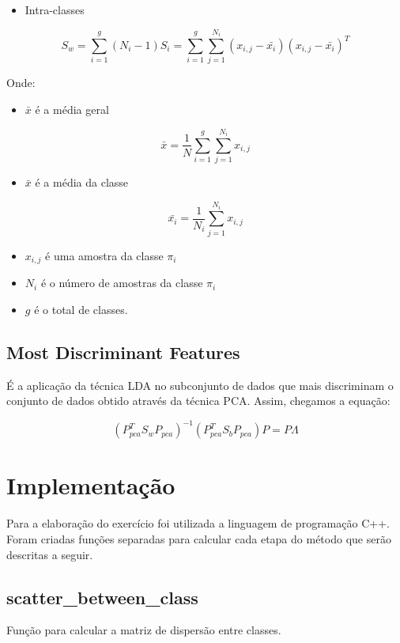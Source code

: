 \documentclass[a4paper, 11pt]{article}
\begin{document}
\begin{itemize}
\item Intra-classes
\end{itemize}
$$
S_w = \sum_{i=1}^{g}(N_i-1)S_i = \sum_{i=1}^{g}\sum_{j=1}^{N_i}(x_{i,j}-\bar{x_i})(x_{i,j}-\bar{x_i})^T
$$

Onde:

\begin{itemize}
\item $\bar{x}$ é a média geral
\end{itemize}

$$
\bar{x} = \frac{1}{N}\sum_{i=1}^g\sum_{j=1}^{N_i}x_{i,j}
$$

\begin{itemize}
\item $\bar{x}$ é a média da classe
\end{itemize}

$$
\bar{x_i} = \frac{1}{N_i}\sum_{j=1}^{N_i}x_{i,j}
$$


\begin{itemize}
\item $x_{i,j}$ é uma amostra da classe $\pi_i$
\item $N_i$ é o número de amostras da classe $\pi_i$
\item $g$ é o total de classes.
\end{itemize}

\subsection*{Most Discriminant Features }
É a aplicação da técnica LDA no subconjunto de dados que mais discriminam o conjunto de dados obtido através da técnica PCA.
Assim, chegamos a equação:

$$
(P_{pca}^{T}S_{w}P_{pca})^{-1}(P_{pca}^{T}S_{b}P_{pca})P=P\Lambda
$$


\section*{Implementação}
Para a elaboração do exercício foi utilizada a linguagem de programação C++.
Foram criadas funções separadas para calcular cada etapa do método que serão descritas a seguir.


\subsection*{scatter\_between\_class}
Função para calcular a matriz de dispersão entre classes.
\end{document}
